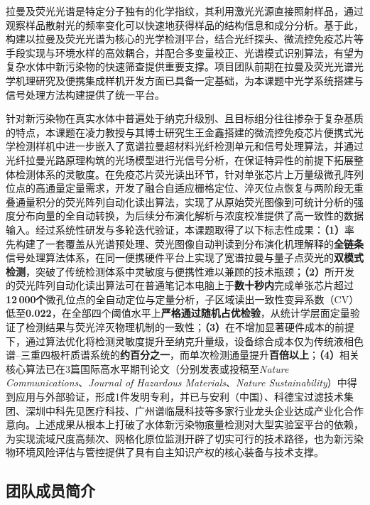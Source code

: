 \documentclass[12pt,a4paper]{article}
\begin{document}
拉曼及荧光光谱是特定分子独有的化学指纹，其利用激光光源直接照射样品，通过观察样品散射光的频率变化可以快速地获得样品的结构信息和成分分析\cite{ref11,ref15,ref16}。基于此，构建以拉曼及荧光光谱为核心的光学检测平台，结合光纤探头、微流控免疫芯片等手段实现与环境水样的高效耦合，并配合多变量校正、光谱模式识别算法，有望为复杂水体中新污染物的快速筛查提供重要支撑。项目团队前期在拉曼及荧光光谱光学机理研究及便携集成样机开发方面已具备一定基础，为本课题中光学系统搭建与信号处理方法构建提供了统一平台。

针对新污染物在真实水体中普遍处于纳克升级别、且目标组分往往掺杂于复杂基质的特点，本课题在凌力教授与其博士研究生王金鑫搭建的微流控免疫芯片便携式光学检测样机中进一步嵌入了宽谱拉曼超材料光纤检测单元和信号处理算法，并通过光纤拉曼光路原理构筑的光场模型进行光信号分析，在保证特异性的前提下拓展整体检测体系的灵敏度。在免疫芯片荧光读出环节，针对单张芯片上万量级微孔阵列位点的高通量定量需求，开发了融合自适应栅格定位、淬灭位点恢复与两阶段无重叠通量积分的荧光阵列自动化读出算法，实现了从原始荧光图像到可统计分析的强度分布向量的全自动转换，为后续分布演化解析与浓度校准提供了高一致性的数据输入。经过系统性研发与多轮迭代验证，本课题取得了以下标志性成果：\textbf{（1）}率先构建了一套覆盖从光谱预处理、荧光图像自动判读到分布演化机理解释的\textbf{全链条}信号处理算法体系，在同一便携硬件平台上实现了宽谱拉曼与量子点荧光的\textbf{双模式检测}，突破了传统检测体系中灵敏度与便携性难以兼顾的技术瓶颈；\textbf{（2）}所开发的荧光阵列自动化读出算法可在普通笔记本电脑上于\textbf{数十秒内}完成单张芯片超过\textbf{12\,000个}微孔位点的全自动定位与定量分析，子区域读出一致性变异系数（CV）低至\textbf{0.022}，在全部四个阈值水平上\textbf{严格通过随机占优检验}，从统计学层面定量验证了检测结果与荧光淬灭物理机制的一致性；\textbf{（3）}在不增加显著硬件成本的前提下，通过算法优化将检测灵敏度提升至纳克升量级，设备综合成本仅为传统液相色谱--三重四极杆质谱系统的\textbf{约百分之一}，而单次检测通量提升\textbf{百倍以上}；\textbf{（4）}相关核心算法已在3篇国际高水平期刊论文（分别发表或投稿至\textit{Nature Communications}、\textit{Journal of Hazardous Materials}、\textit{Nature Sustainability}）中得到应用与外部验证，形成1件发明专利，并已与安利（中国）、科德宝过滤技术集团、深圳中科先见医疗科技、广州谱临晟科技等多家行业龙头企业达成产业化合作意向。上述成果从根本上打破了水体新污染物痕量检测对大型实验室平台的依赖，为实现流域尺度高频次、网格化原位监测开辟了切实可行的技术路径，也为新污染物环境风险评估与管控提供了具有自主知识产权的核心装备与技术支撑。

\subsection{团队成员简介}
\end{document}
